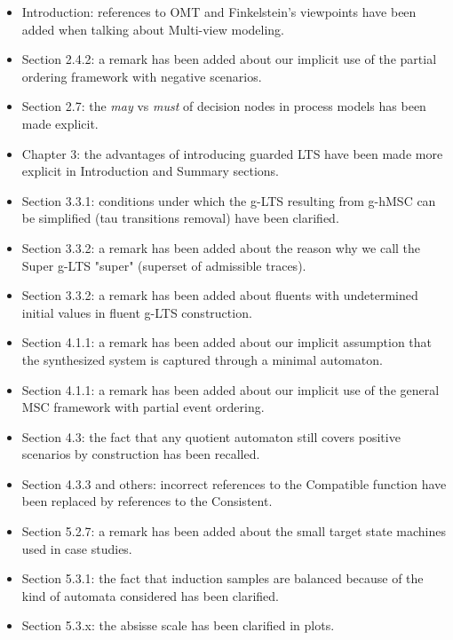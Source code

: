\begin{itemize}
\item Introduction: references to OMT and Finkelstein's viewpoints have been added 
  when talking about Multi-view modeling.
\item Section 2.4.2: a remark has been added about our implicit use of the partial 
  ordering framework with negative scenarios.
\item Section 2.7: the \emph{may} vs \emph{must} of decision nodes in process models has been 
  made explicit.
\item Chapter 3: the advantages of introducing guarded LTS have been made more 
  explicit in Introduction and Summary sections.
\item Section 3.3.1: conditions under which the g-LTS resulting from g-hMSC can be
  simplified (tau transitions removal) have been clarified.
\item Section 3.3.2: a remark has been added about the reason why we call the Super 
  g-LTS "super" (superset of admissible traces).
\item Section 3.3.2: a remark has been added about fluents with undetermined initial
  values in fluent g-LTS construction.
\item Section 4.1.1: a remark has been added about our implicit assumption that the
  synthesized system is captured through a minimal automaton.
\item Section 4.1.1: a remark has been added about our implicit use of the general 
  MSC framework with partial event ordering.
\item Section 4.3: the fact that any quotient automaton still covers positive 
  scenarios by construction has been recalled.
\item Section 4.3.3 and others: incorrect references to the Compatible function have
  been replaced by references to the Consistent.
\item Section 5.2.7: a remark has been added about the small target state machines 
  used in case studies.
\item Section 5.3.1: the fact that induction samples are balanced because of the 
  kind of automata considered has been clarified.
\item Section 5.3.x: the absisse scale has been clarified in plots.
\end{itemize}

